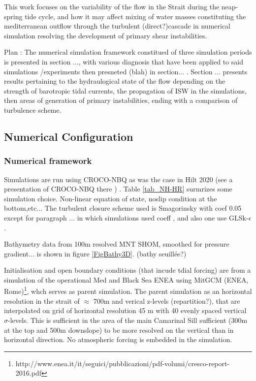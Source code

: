 This work focuses on the variability of the flow in the Strait during the neap-spring tide cycle, and how it may affect mixing of water masses constituting the mediterranean outflow through the turbulent (direct?)cascade in numerical simulation resolving the development of primary shear instabilities.

Plan :
The numerical simulation framework constitued of three simulation periods is presented in section ..., with various diagnosis that have been applied to said simulations /experiments then presneted (blah) in section... . Section ... presents results pertaining to the hydraulogical state of the flow depending on the strength of barotropic tidal currents, the propagation of ISW in the simulations, then areas of generation of primary instabilities, ending with a comparison of turbulence scheme.






\subsection{Numerical Configuration}
\subsubsection{Numerical framework}

Simulations are run using CROCO-NBQ as was the case in Hilt 2020 (see a presentation of CROCO-NBQ there ) . Table \ref{tab_NH-HR} surmrizes some simulation choice. Non-linear equation of state, noslip condition at the bottom,etc...  The turbulent closure scheme used is Smagorinsky with coef 0.05 except for paragraph ... in which simulations used coeff , and also one use GLSk-$\epsilon$.

Bathymetry data from 100m resolved MNT SHOM, smoothed for pressure gradient... is shown in figure \ref{FigBathy3D}. (bathy seuillée?)


Initialisation and open boundary conditions (that incude tdial forcing) are from a simulation of the operational Med and Black Sea ENEA using MitGCM (ENEA, Rome)\footnote{http://www.enea.it/it/seguici/pubblicazioni/pdf-volumi/cresco-report-2016.pdf}, whch serves as parent simulation. The parent simulation as an horizontal resolution in the strait of $\approx$ 700m and verical z-levels (repartition?), that are interpolated on grid of horizontal resolution 45 m with 40 evenly spaced vertical $\sigma$-levels. This is sufficient in the area of the main Camarinal Sill sufficient (300m at the top and 500m downslope) to be more resolved on the vertical than in horizontal direction. No atmospheric forcing is embedded in the simulation.

